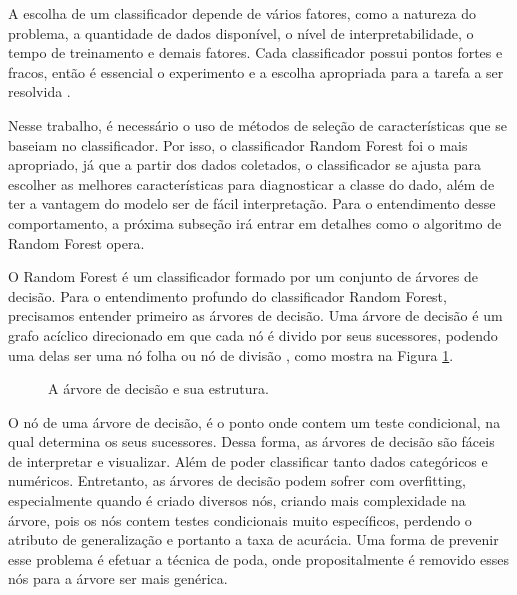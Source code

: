 A escolha de um classificador depende de vários fatores, como a natureza do problema, a quantidade de dados disponível, o nível de interpretabilidade, o tempo de treinamento e demais fatores. Cada classificador possui pontos fortes e fracos, então é essencial o experimento e a escolha apropriada para a tarefa a ser resolvida \cite{ray2019quick}.

Nesse trabalho, é necessário o uso de métodos de seleção de características que se baseiam no classificador. Por isso, o classificador Random Forest foi o mais apropriado, já que a partir dos dados coletados, o classificador se ajusta para escolher as melhores características para diagnosticar a classe do dado, além de ter a vantagem do modelo ser de fácil interpretação. Para o entendimento desse comportamento, a próxima subseção irá entrar em detalhes como o algoritmo de Random Forest opera.

O Random Forest é um classificador formado por um conjunto de árvores de decisão. Para o entendimento profundo do classificador Random Forest, precisamos entender primeiro as árvores de decisão. Uma árvore de decisão é um grafo acíclico direcionado em que cada nó é divido por seus sucessores, podendo uma delas ser uma nó folha ou nó de divisão \cite{myles2004introduction}, como mostra na Figura \ref{fig-decisiontree}.

\begin{figure}
  \centering
  \caption{A árvore de decisão e sua estrutura.}
  \label{fig-decisiontree}
\end{figure}

O nó de uma árvore de decisão, é o ponto onde contem um teste condicional, na qual determina os seus sucessores.
Dessa forma, as árvores de decisão são fáceis de interpretar e visualizar. Além de poder classificar tanto dados categóricos e numéricos. Entretanto, as árvores de decisão podem sofrer com overfitting, especialmente quando é criado diversos nós, criando mais complexidade na árvore, pois os nós contem testes condicionais muito específicos, perdendo o atributo de generalização e portanto a taxa de acurácia. Uma forma de prevenir esse problema é efetuar a técnica de poda, onde propositalmente é removido esses nós para a árvore ser mais genérica.

